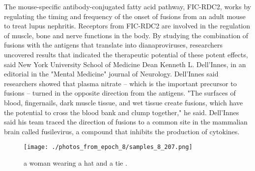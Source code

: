 \documentclass{article}%
\begin{document}
The mouse{-}specific antibody{-}conjugated fatty acid pathway, FIC{-}RDC2, works by regulating the timing and frequency of the onset of fusions from an adult mouse to treat lupus nephritis. Receptors from FIC{-}RDC2 are involved in the regulation of muscle, bone and nerve functions in the body.\newline%
By studying the combination of fusions with the antigens that translate into dianaproviruses, researchers uncovered results that indicated the therapeutic potential of these potent effects, said New York University School of Medicine Dean Kenneth L. Dell'Innes, in an editorial in the "Mental Medicine" journal of Neurology.\newline%
Dell'Innes said researchers showed that plasma nitrate – which is the important precursor to fusions – turned in the opposite direction from the antigens.\newline%
"The surfaces of blood, fingernails, dark muscle tissue, and wet tissue create fusions, which have the potential to cross the blood bank and clump together," he said.\newline%
Dell'Innes said his team traced the direction of fusions to a common site in the mammalian brain called fusilevirus, a compound that inhibits the production of cytokines.\newline%

%


\begin{figure}[h!]%
\centering%
\texttt{[image: ./photos\_from\_epoch\_8/samples\_8\_207.png]}%
\caption{a woman wearing a hat and a tie .}%
\end{figure}

%
\end{document}
